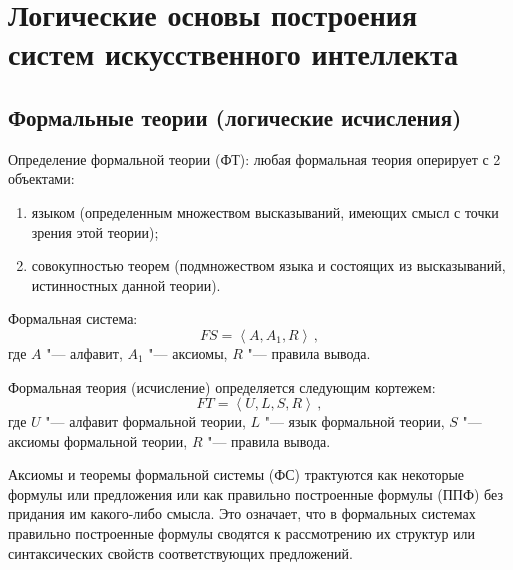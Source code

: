 \chapter{Логические основы построения систем
искусственного интеллекта}

\section{Формальные теории (логические исчисления)}

Определение формальной теории (ФТ): любая формальная теория оперирует
с 2 объектами:
\begin{enumerate}
\item языком (определенным множеством высказываний, имеющих смысл с
точки зрения этой теории);
\item совокупностью теорем (подмножеством языка и состоящих из
высказываний, истинностных данной теории).
\end{enumerate}
Формальная система:
$$ FS = \left<A,A_1,R\right>\,,
$$
где $A$ "--- алфавит, $A_1$ "--- аксиомы, $R$ "--- правила вывода.

Формальная теория (исчисление) определяется следующим кортежем:
$$ FT=\left<U,L,S,R\right>\,,
$$
где $U$ "--- алфавит формальной теории, $L$ "--- язык формальной теории,
$S$ "--- аксиомы формальной теории, $R$ "--- правила вывода.


\begin{rem} Аксиомы и
теоремы формальной системы (ФС) трактуются как некоторые формулы или
предложения или как правильно построенные формулы (ППФ) без придания
им какого-либо смысла. Это означает, что в формальных системах
правильно построенные формулы сводятся к рассмотрению их структур или
синтаксических свойств соответствующих предложений.
\end{rem}

